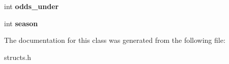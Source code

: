 \begin{DoxyCompactItemize}
\item 
\hypertarget{classarena__fights_a38f077818459049c616f6188df12ed9f}{int {\bfseries odds\-\_\-under}}\label{classarena__fights_a38f077818459049c616f6188df12ed9f}

\item 
\hypertarget{classarena__fights_a189a037aeb4a117c55f0fb43cc310279}{int {\bfseries season}}\label{classarena__fights_a189a037aeb4a117c55f0fb43cc310279}

\end{DoxyCompactItemize}


The documentation for this class was generated from the following file\-:\begin{DoxyCompactItemize}
\item 
structs.\-h\end{DoxyCompactItemize}
